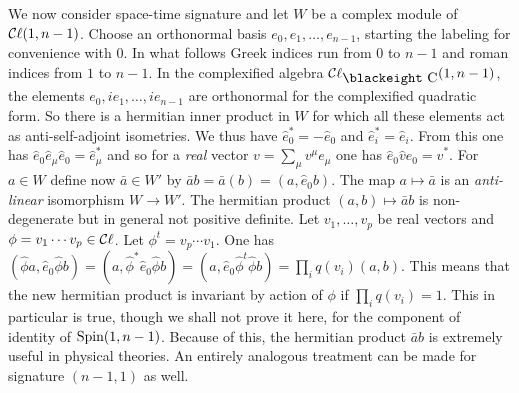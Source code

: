 \documentclass[12pt,titlepage]{article}
\def\bbfeight#1{\hbox{\blackeight #1}}
\def\lCe{\bbfeight C}
\def\cC{{\cal C}}
\def\Cl{{\cC\ell}}
\def\Spin{\hbox{Spin}}
\begin{document}
We now consider space-time signature and let \(W\) be a complex module of 
\(\Cl(1,n-1)\). Choose  an orthonormal basis
\(e_0,e_1,\dots,e_{n-1}\), starting the labeling for convenience with \(0\). 
In what follows Greek indices run from \(0\) to \(n-1\) and roman indices 
from \(1\) to \(n-1\). In the
complexified algebra \(\Cl_{\lCe}(1,n-1)\), the elements \(e_0,
ie_1,\dots, ie_{n-1}\) are orthonormal for the complexified quadratic
form. So there is a hermitian inner product in \(W\) for which all
these elements act as anti-self-adjoint isometries. 
We thus have \(\hat e_0^*=-\hat e_0\) and \(\hat e_i^* = \hat e_i\).
From this one has \(\hat  e_0\hat e_\mu\hat e_0 = \hat e_\mu^*\) and so
for a {\em real\/} vector \(v=\sum_\mu v^\mu e_\mu\) one has 
\(\hat  e_0\hat v\hat e_0 = \hat v^*\). For \(a\in W\) define now \(\bar
a\in W'\) by \(\bar a b = \bar a(b) = (a,\hat e_0 b)\). The map
\(a\mapsto \bar a\) is an {\em anti-linear\/} isomorphism \(W \to W'\).
The hermitian product \((a,b) \mapsto \bar a b\) is non-degenerate but 
in general not positive definite. Let \(v_1,\dots, v_p\) be real vectors
and \(\phi=v_1\cdots v_p\in \Cl\). Let \(\phi^t = v_p\cdots v_1\). 
One has \((\hat\phi a, \hat e_0\hat\phi
b) =(a, \hat\phi^* \hat e_0\hat \phi b) = 
(a, \hat e_0 \hat \phi^t\hat \phi b) =
\prod_iq(v_i) (a,b)\). This means that the new hermitian product is
invariant by action of \(\phi\) if \(\prod_iq(v_i)=1\). This in
particular is true, though we shall not prove it here,
for the component of identity of \(\Spin(1,n-1)\). 
Because of this, the hermitian product
\(\bar a b\) is extremely useful in physical theories. An entirely
analogous treatment can be made for signature \((n-1,1)\) as well. 
\end{document}
